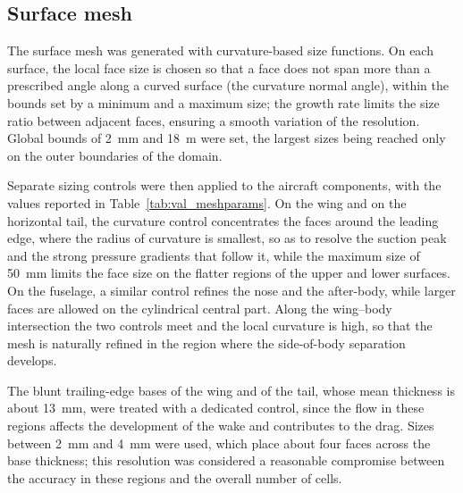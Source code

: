 \subsection{Surface mesh}
\label{sec:val_surfmesh}
The surface mesh was generated with curvature-based size functions. On each surface, the local face size is chosen so that a face does not span more than a prescribed angle along a curved surface (the curvature normal angle), within the bounds set by a minimum and a maximum size; the growth rate limits the size ratio between adjacent faces, ensuring a smooth variation of the resolution. Global bounds of \SI{2}{mm} and \SI{18}{m} were set, the largest sizes being reached only on the outer boundaries of the domain.

Separate sizing controls were then applied to the aircraft components, with the values reported in Table~\ref{tab:val_meshparams}. On the wing and on the horizontal tail, the curvature control concentrates the faces around the leading edge, where the radius of curvature is smallest, so as to resolve the suction peak and the strong pressure gradients that follow it, while the maximum size of \SI{50}{mm} limits the face size on the flatter regions of the upper and lower surfaces. On the fuselage, a similar control refines the nose and the after-body, while larger faces are allowed on the cylindrical central part. Along the wing--body intersection the two controls meet and the local curvature is high, so that the mesh is naturally refined in the region where the side-of-body separation develops.

The blunt trailing-edge bases of the wing and of the tail, whose mean thickness is about \SI{13}{mm}, were treated with a dedicated control, since the flow in these regions affects the development of the wake and contributes to the drag. Sizes between \SI{2}{mm} and \SI{4}{mm} were used, which place about four faces across the base thickness; this resolution was considered a reasonable compromise between the accuracy in these regions and the overall number of cells.


